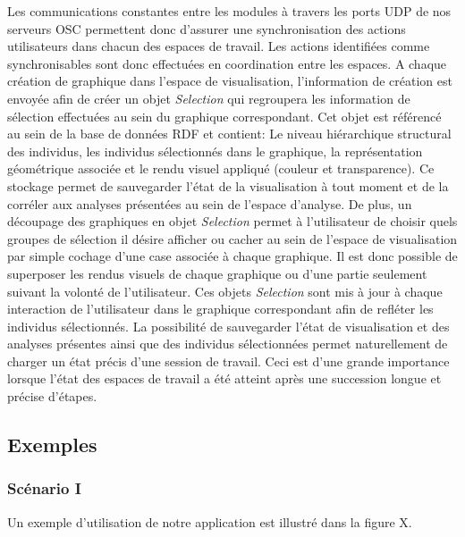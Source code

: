Les communications constantes entre les modules à travers les ports UDP de nos serveurs OSC permettent donc d'assurer une synchronisation des actions utilisateurs dans chacun des espaces de travail. Les actions identifiées comme synchronisables sont donc effectuées en coordination entre les espaces.
A chaque création de graphique dans l'espace de visualisation, l'information de création est envoyée afin de créer un objet \textit{Selection} qui regroupera les information de sélection effectuées au sein du graphique correspondant. Cet objet est référencé au sein de la base de données RDF et contient: Le niveau hiérarchique structural des individus, les individus sélectionnés dans le graphique, la représentation géométrique associée et le rendu visuel appliqué (couleur et transparence). Ce stockage permet de sauvegarder l'état de la visualisation à tout moment et de la corréler aux analyses présentées au sein de l'espace d'analyse. De plus, un découpage des graphiques en objet \textit{Selection} permet à l'utilisateur de choisir quels groupes de sélection il désire afficher ou cacher au sein de l'espace de visualisation par simple cochage d'une case associée à chaque graphique. Il est donc possible de superposer les rendus visuels de chaque graphique ou d'une partie seulement suivant la volonté de l'utilisateur. Ces objets \textit{Selection} sont mis à jour à chaque interaction de l'utilisateur dans le graphique correspondant afin de refléter les individus sélectionnés. La possibilité de sauvegarder l'état de visualisation et des analyses présentes ainsi que des individus sélectionnées permet naturellement de charger un état précis d'une session de travail. Ceci est d'une grande importance lorsque l'état des espaces de travail a été atteint après une succession longue et précise d'étapes.

\subsection{Exemples}

\subsubsection{Scénario I}

Un exemple d'utilisation de notre application est illustré dans la figure X.


